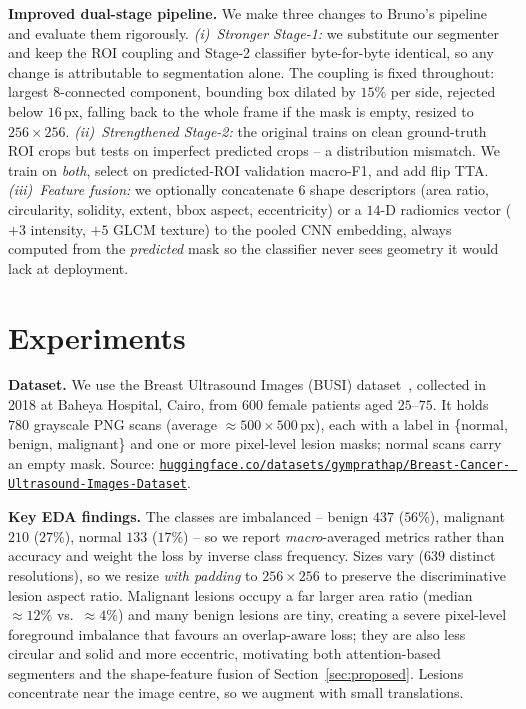 \documentclass[10pt,twocolumn]{article}
\begin{document}
\textbf{Improved dual-stage pipeline.} We make three changes to Bruno's pipeline
and evaluate them rigorously. \emph{(i)~Stronger Stage-1:} we substitute our
segmenter and keep the ROI coupling and Stage-2 classifier byte-for-byte identical,
so any change is attributable to segmentation alone. The coupling is fixed
throughout: largest 8-connected component, bounding box dilated by $15\%$ per side,
rejected below $16$\,px, falling back to the whole frame if the mask is empty,
resized to $256\times256$. \emph{(ii)~Strengthened Stage-2:} the original trains on
clean ground-truth ROI crops but tests on imperfect predicted crops -- a
distribution mismatch. We train on \emph{both}, select on predicted-ROI validation
macro-F1, and add flip TTA. \emph{(iii)~Feature fusion:} we optionally concatenate
$6$ shape descriptors (area ratio, circularity, solidity, extent, bbox aspect,
eccentricity) or a $14$-D radiomics vector ($+3$ intensity, $+5$ GLCM texture) to
the pooled CNN embedding, always computed from the \emph{predicted} mask so the
classifier never sees geometry it would lack at deployment.

\section{Experiments}
\textbf{Dataset.} We use the Breast Ultrasound Images (BUSI)
dataset~\cite{aldhabyani2020busi}, collected in 2018 at Baheya Hospital, Cairo,
from $600$ female patients aged $25$--$75$. It holds $780$ grayscale PNG scans
(average $\approx500\times500$\,px), each with a label in \{normal, benign,
malignant\} and one or more pixel-level lesion masks; normal scans carry an empty
mask. Source:
\href{https://huggingface.co/datasets/gymprathap/Breast-Cancer-Ultrasound-Images-Dataset}%
{\texttt{huggingface.co/datasets/\allowbreak gymprathap/Breast-Cancer-\allowbreak
Ultrasound-Images-Dataset}}.

\textbf{Key EDA findings.} The classes are imbalanced -- benign $437$ ($56\%$),
malignant $210$ ($27\%$), normal $133$ ($17\%$) -- so we report
\emph{macro}-averaged metrics rather than accuracy and weight the loss by inverse
class frequency. Sizes vary ($639$ distinct resolutions), so we resize \emph{with
padding} to $256\times256$ to preserve the discriminative lesion aspect ratio.
Malignant lesions occupy a far larger area ratio (median $\approx12\%$ vs.\
$\approx4\%$) and many benign lesions are tiny, creating a severe pixel-level
foreground imbalance that favours an overlap-aware loss; they are also less
circular and solid and more eccentric, motivating both attention-based segmenters
and the shape-feature fusion of Section~\ref{sec:proposed}. Lesions concentrate
near the image centre, so we augment with small translations.
\end{document}
